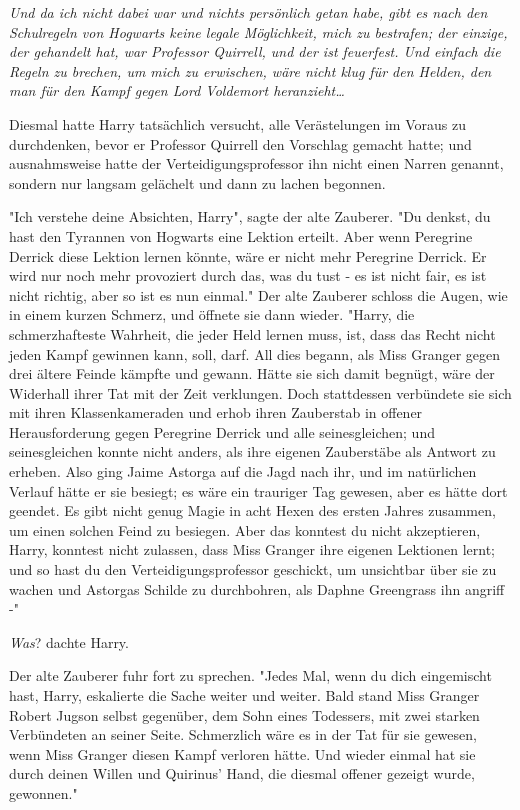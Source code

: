 {\emph{Und da ich nicht dabei war und nichts persönlich getan habe, gibt es nach den Schulregeln von Hogwarts keine legale Möglichkeit, mich zu bestrafen; der einzige, der gehandelt hat, war Professor Quirrell, und der ist feuerfest. Und einfach die Regeln zu brechen, um mich zu erwischen, wäre nicht klug für den Helden, den man für den Kampf gegen Lord Voldemort heranzieht…}

Diesmal hatte Harry tatsächlich versucht, alle Verästelungen im Voraus zu durchdenken, bevor er Professor Quirrell den Vorschlag gemacht hatte; und ausnahmsweise hatte der Verteidigungsprofessor ihn nicht einen Narren genannt, sondern nur langsam gelächelt und dann zu lachen begonnen.

"Ich verstehe deine Absichten, Harry", sagte der alte Zauberer. "Du denkst, du hast den Tyrannen von Hogwarts eine Lektion erteilt. Aber wenn Peregrine Derrick diese Lektion lernen könnte, wäre er nicht mehr Peregrine Derrick. Er wird nur noch mehr provoziert durch das, was du tust - es ist nicht fair, es ist nicht richtig, aber so ist es nun einmal." Der alte Zauberer schloss die Augen, wie in einem kurzen Schmerz, und öffnete sie dann wieder. "Harry, die schmerzhafteste Wahrheit, die jeder Held lernen muss, ist, dass das Recht nicht jeden Kampf gewinnen kann, soll, darf. All dies begann, als Miss Granger gegen drei ältere Feinde kämpfte und gewann. Hätte sie sich damit begnügt, wäre der Widerhall ihrer Tat mit der Zeit verklungen. Doch stattdessen verbündete sie sich mit ihren Klassenkameraden und erhob ihren Zauberstab in offener Herausforderung gegen Peregrine Derrick und alle seinesgleichen; und seinesgleichen konnte nicht anders, als ihre eigenen Zauberstäbe als Antwort zu erheben. Also ging Jaime Astorga auf die Jagd nach ihr, und im natürlichen Verlauf hätte er sie besiegt; es wäre ein trauriger Tag gewesen, aber es hätte dort geendet. Es gibt nicht genug Magie in acht Hexen des ersten Jahres zusammen, um einen solchen Feind zu besiegen. Aber das konntest du nicht akzeptieren, Harry, konntest nicht zulassen, dass Miss Granger ihre eigenen Lektionen lernt; und so hast du den Verteidigungsprofessor geschickt, um unsichtbar über sie zu wachen und Astorgas Schilde zu durchbohren, als Daphne Greengrass ihn angriff -"

\emph{Was}? dachte Harry.

Der alte Zauberer fuhr fort zu sprechen. "Jedes Mal, wenn du dich eingemischt hast, Harry, eskalierte die Sache weiter und weiter. Bald stand Miss Granger Robert Jugson selbst gegenüber, dem Sohn eines Todessers, mit zwei starken Verbündeten an seiner Seite. Schmerzlich wäre es in der Tat für sie gewesen, wenn Miss Granger diesen Kampf verloren hätte. Und wieder einmal hat sie durch deinen Willen und Quirinus' Hand, die diesmal offener gezeigt wurde, gewonnen."

}
